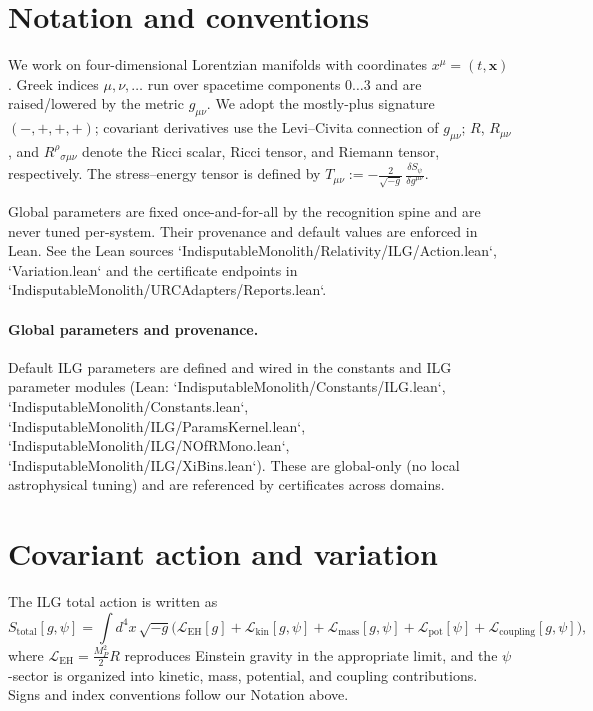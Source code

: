 \documentclass[11pt]{article}
\newcommand{\Stotal}{S_{\mathrm{total}}}
\newcommand{\Tmunu}{T_{\mu\nu}}
\begin{document}
\section*{Notation and conventions}
We work on four-dimensional Lorentzian manifolds with coordinates $x^\mu=(t,\bm{x})$. Greek indices $\mu,\nu,\dots$ run over spacetime components $0\dots 3$ and are raised/lowered by the metric $g_{\mu\nu}$. We adopt the mostly-plus signature $(-,+,+,+)$; covariant derivatives use the Levi--Civita connection of $g_{\mu\nu}$; $R$, $R_{\mu\nu}$, and $R^\rho{}_{\sigma\mu\nu}$ denote the Ricci scalar, Ricci tensor, and Riemann tensor, respectively. The stress--energy tensor is defined by $\Tmunu := -\frac{2}{\sqrt{-g}}\,\frac{\delta S_\psi}{\delta g^{\mu\nu}}$.

Global parameters are fixed once-and-for-all by the recognition spine and are never tuned per-system. Their provenance and default values are enforced in Lean. See the Lean sources `IndisputableMonolith/Relativity/ILG/Action.lean`, `Variation.lean` and the certificate endpoints in `IndisputableMonolith/URCAdapters/Reports.lean`.

\paragraph{Global parameters and provenance.}
Default ILG parameters are defined and wired in the constants and ILG parameter modules (Lean: `IndisputableMonolith/Constants/ILG.lean`, `IndisputableMonolith/Constants.lean`, `IndisputableMonolith/ILG/ParamsKernel.lean`, `IndisputableMonolith/ILG/NOfRMono.lean`, `IndisputableMonolith/ILG/XiBins.lean`). These are global-only (no local astrophysical tuning) and are referenced by certificates across domains.

\section{Covariant action and variation}\label{sec:covariant-action}
The ILG total action is written as
\begin{equation}
  \Stotal[g,\psi] 
   = \int \! d^4x\, \sqrt{-g} \Big( \mathcal{L}_{\mathrm{EH}}[g] 
     + \mathcal{L}_{\mathrm{kin}}[g,\psi]
     + \mathcal{L}_{\mathrm{mass}}[g,\psi]
     + \mathcal{L}_{\mathrm{pot}}[\psi]
     + \mathcal{L}_{\mathrm{coupling}}[g,\psi]\Big),
  \label{eq:Stotal}
\end{equation}
where $\mathcal{L}_{\mathrm{EH}} = \frac{M_P^2}{2} R$ reproduces Einstein gravity in the appropriate limit, and the $\psi$-sector is organized into kinetic, mass, potential, and coupling contributions. Signs and index conventions follow our Notation above.
\end{document}
